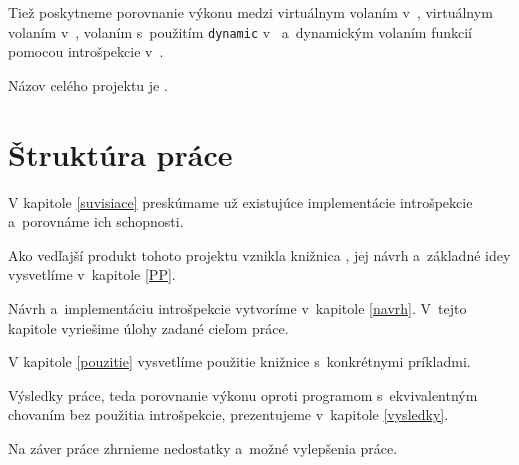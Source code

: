 Tiež poskytneme porovnanie výkonu medzi virtuálnym volaním v~\Cpp{}, virtuálnym volaním v~\Csharp{}, volaním s~použitím \texttt{dynamic} v~\Csharp{} a~dynamickým volaním funkcií pomocou introšpekcie v~\Cpp{}.

Názov celého projektu je \PPreflection{}.

\section{Štruktúra práce}

V kapitole \ref{suvisiace} preskúmame už existujúce implementácie introšpekcie a~porovnáme ich schopnosti.

Ako vedľajší produkt tohoto projektu vznikla knižnica \PP{}, jej návrh a~základné idey vysvetlíme v~kapitole \ref{PP}.

Návrh a~implementáciu introšpekcie vytvoríme v~kapitole \ref{navrh}. V~tejto kapitole vyriešime úlohy zadané cieľom práce.

V kapitole \ref{pouzitie} vysvetlíme použitie knižnice s~konkrétnymi príkladmi.

Výsledky práce, teda porovnanie výkonu oproti programom s~ekvivalentným chovaním bez použitia introšpekcie, prezentujeme v~kapitole \ref{vysledky}.

Na záver práce zhrnieme nedostatky a~možné vylepšenia práce.
